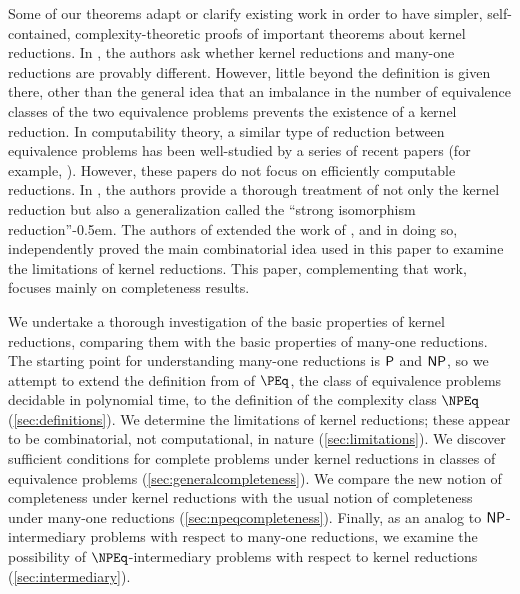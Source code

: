 Some of our theorems adapt or clarify existing work in order to have simpler, self-contained, complexity-theoretic proofs of important theorems about kernel reductions.
In \autocite{fg11}, the authors ask whether kernel reductions and many-one reductions are provably different.
However, little beyond the definition is given there, other than the general idea that an imbalance in the number of equivalence classes of the two equivalence problems prevents the existence of a kernel reduction.
In computability theory, a similar type of reduction between equivalence problems has been well-studied by a series of recent papers (for example, \autocite{gg01, ff12, ffn12, chm12, imnn13, almnss14, mn14}).
However, these papers do not focus on efficiently computable reductions.
In \autocite{bcffm}, the authors provide a thorough treatment of not only the kernel reduction but also a generalization called the ``strong isomorphism reduction''\kern-0.5em.
The authors of \autocite{gz14} extended the work of \autocite{bcffm}, and in doing so, independently proved the main combinatorial idea used in this paper to examine the limitations of kernel reductions.
This paper, complementing that work, focuses mainly on completeness results.

We undertake a thorough investigation of the basic properties of kernel reductions, comparing them with the basic properties of many-one reductions.
The starting point for understanding many-one reductions is $\P$ and $\NP$, so we attempt to extend the definition from \autocite{fg11} of $\PEq$, the class of equivalence problems decidable in polynomial time, to the definition of the complexity class $\NPEq$ (\autoref{sec:definitions}).
We determine the limitations of kernel reductions; these appear to be combinatorial, not computational, in nature (\autoref{sec:limitations}).
We discover sufficient conditions for complete problems under kernel reductions in classes of equivalence problems (\autoref{sec:generalcompleteness}).
We compare the new notion of completeness under kernel reductions with the usual notion of completeness under many-one reductions (\autoref{sec:npeqcompleteness}).
Finally, as an analog to $\NP$-intermediary problems with respect to many-one reductions, we examine the possibility of $\NPEq$-intermediary problems with respect to kernel reductions (\autoref{sec:intermediary}).
